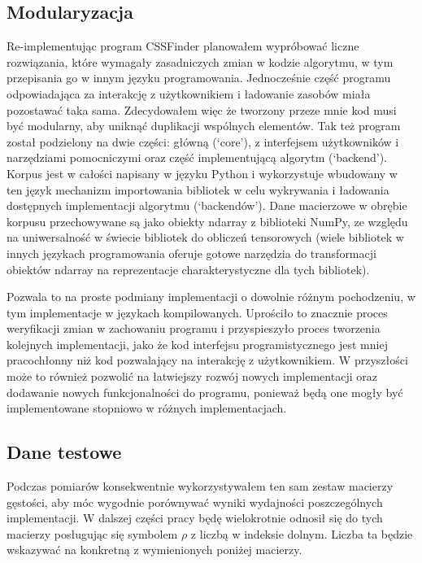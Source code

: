 \documentclass[11pt, a4paper]{article}
\begin{document}
\begin{sloppypar}
    \subsection{Modularyzacja}
    Re-implementując program CSSFinder planowałem wypróbować liczne rozwiązania, które wymagały
    zasadniczych zmian w kodzie algorytmu, w tym przepisania go w innym języku
    programowania. Jednocześnie część programu odpowiadająca za interakcję z użytkownikiem
    i ładowanie zasobów miała pozostawać taka sama. Zdecydowałem więc że tworzony przeze
    mnie kod musi być modularny, aby uniknąć duplikacji wspólnych elementów. Tak też
    program został podzielony na dwie części: główną (`core'), z interfejsem
    użytkowników i narzędziami pomocniczymi oraz część implementującą algorytm (`backend').
    Korpus jest w całości napisany w języku Python i wykorzystuje wbudowany w ten język mechanizm
    importowania bibliotek w celu wykrywania i ładowania dostępnych implementacji algorytmu
    (`backendów'). Dane macierzowe w obrębie korpusu przechowywane są jako obiekty
    ndarray z biblioteki NumPy, ze względu na uniwersalność w świecie bibliotek do obliczeń
    tensorowych (wiele bibliotek w innych językach programowania oferuje gotowe
    narzędzia do transformacji obiektów ndarray na reprezentacje charakterystyczne dla
    tych bibliotek).

    Pozwala to na proste podmiany implementacji o dowolnie różnym pochodzeniu, w tym
    implementacje w językach kompilowanych. Uprościło to znacznie proces weryfikacji zmian
    w zachowaniu programu i przyspieszyło proces tworzenia kolejnych implementacji, jako
    że kod interfejsu programistycznego jest mniej pracochłonny niż kod pozwalający na
    interakcję z użytkownikiem. W przyszłości może to również pozwolić na łatwiejszy rozwój
    nowych implementacji oraz dodawanie nowych funkcjonalności do programu, ponieważ
    będą one mogły być implementowane stopniowo w różnych implementacjach.

    \subsection{Dane testowe}
    Podczas pomiarów konsekwentnie wykorzystywałem ten sam zestaw macierzy gęstości, aby
    móc wygodnie porównywać wyniki wydajności poszczególnych implementacji. W dalszej
    części pracy będę wielokrotnie odnosił się do tych macierzy posługując się symbolem
    $\rho$ z liczbą w indeksie dolnym. Liczba ta będzie wskazywać na konkretną z wymienionych
    poniżej macierzy.


\end{sloppypar}
\end{document}
